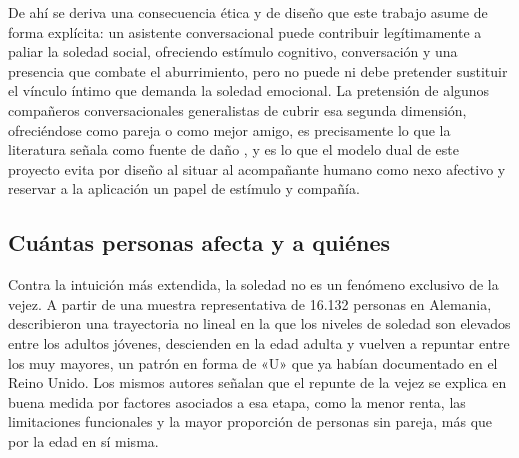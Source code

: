 De ahí se deriva una consecuencia ética y de diseño que este trabajo asume de forma explícita: un asistente conversacional puede contribuir legítimamente a paliar la soledad social, ofreciendo estímulo cognitivo, conversación y una presencia que combate el aburrimiento, pero no puede ni debe pretender sustituir el vínculo íntimo que demanda la soledad emocional. La pretensión de algunos compañeros conversacionales generalistas de cubrir esa segunda dimensión, ofreciéndose como pareja o como mejor amigo, es precisamente lo que la literatura señala como fuente de daño \citep{Laestadius2024}, y es lo que el modelo dual de este proyecto evita por diseño al situar al acompañante humano como nexo afectivo y reservar a la aplicación un papel de estímulo y compañía.

\subsection{Cuántas personas afecta y a quiénes}

Contra la intuición más extendida, la soledad no es un fenómeno exclusivo de la vejez. A partir de una muestra representativa de 16.132 personas en Alemania, \textcite{Luhmann2016} describieron una trayectoria no lineal en la que los niveles de soledad son elevados entre los adultos jóvenes, descienden en la edad adulta y vuelven a repuntar entre los muy mayores, un patrón en forma de «U» que \textcite{Victor2012} ya habían documentado en el Reino Unido. Los mismos autores señalan que el repunte de la vejez se explica en buena medida por factores asociados a esa etapa, como la menor renta, las limitaciones funcionales y la mayor proporción de personas sin pareja, más que por la edad en sí misma.

